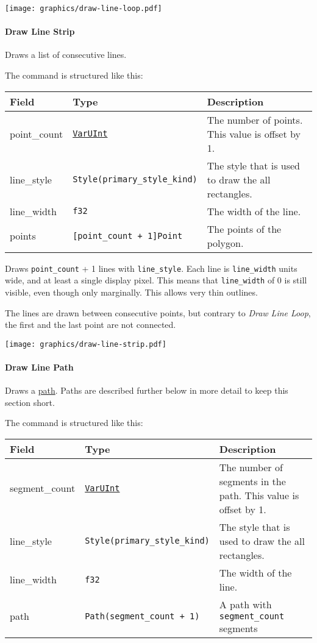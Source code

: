 \documentclass[]{article}
\begin{document}
\texttt{[image: graphics/draw-line-loop.pdf]}

\hypertarget{draw-line-strip}{%
\paragraph{Draw Line Strip}\label{draw-line-strip}}

Draws a list of consecutive lines.

The command is structured like this:

\begin{longtable}[]{@{}p{1in}p{2in}p{3in}@{}}
\toprule
Field & Type & Description \\
\midrule
\endhead
point\_count & \protect\hyperlink{varuint}{\texttt{VarUInt}} & The
number of points. This value is offset by 1. \\
line\_style & \texttt{Style(primary\_style\_kind)} & The style that is
used to draw the all rectangles. \\
line\_width & \texttt{f32} & The width of the line. \\
points & \texttt{{[}point\_count\ +\ 1{]}Point} & The points of the
polygon. \\
\bottomrule
\end{longtable}

Draws \texttt{point\_count} + 1 lines with \texttt{line\_style}. Each
line is \texttt{line\_width} units wide, and at least a single display
pixel. This means that \texttt{line\_width} of 0 is still visible, even
though only marginally. This allows very thin outlines.

The lines are drawn between consecutive points, but contrary to \emph{Draw Line Loop}, the first and the last point are not connected.

\texttt{[image: graphics/draw-line-strip.pdf]}

\hypertarget{draw-line-path}{%
\paragraph{Draw Line Path}\label{draw-line-path}}

Draws a \protect\hyperlink{path}{path}. Paths are described further
below in more detail to keep this section short.

The command is structured like this:

\begin{longtable}[]{@{}p{1in}p{2in}p{3in}@{}}
\toprule
Field & Type & Description \\
\midrule
\endhead
segment\_count & \protect\hyperlink{varuint}{\texttt{VarUInt}} & The
number of segments in the path. This value is offset by 1. \\
line\_style & \texttt{Style(primary\_style\_kind)} & The style that is
used to draw the all rectangles. \\
line\_width & \texttt{f32} & The width of the line. \\
path & \texttt{Path(segment\_count\ +\ 1)} & A path with
\texttt{segment\_count} segments \\
\bottomrule
\end{longtable}
\end{document}

